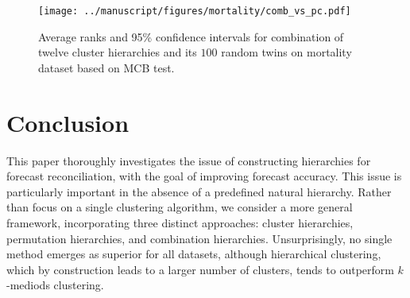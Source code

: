 \documentclass[a4paper,review,12pt,authoryear]{elsarticle}
\begin{document}
\begin{figure}[h!]
    \centering
    \texttt{[image: ../manuscript/figures/mortality/comb\_vs\_pc.pdf]}
    \vspace{-0.1in}\caption{\label{fig:P4_a_vs_pa} Average ranks and 95\% confidence intervals for combination of twelve cluster hierarchies and its $100$ random twins on mortality dataset based on MCB test.}
\end{figure}

\section{Conclusion}
\label{sec:conclusion}

This paper thoroughly investigates the issue of constructing hierarchies for forecast reconciliation, with the goal of improving forecast accuracy. This issue is particularly important in the absence of a predefined natural hierarchy. Rather than focus on a single clustering algorithm, we consider a more general framework, incorporating three distinct approaches: cluster hierarchies, permutation hierarchies, and combination hierarchies. Unsurprisingly, no single method emerges as superior for all datasets, although hierarchical clustering, which by construction leads to a larger number of clusters, tends to outperform $k$-mediods clustering.
\end{document}
